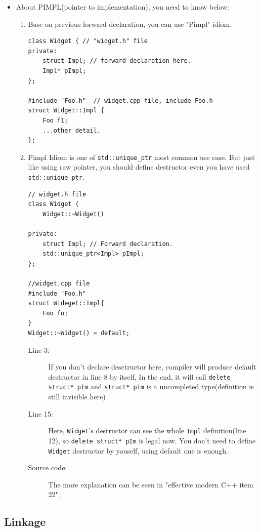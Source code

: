 \documentclass[a4paper,11pt,twoside]{book}
\begin{document}
\begin{itemize}
	\item About PIMPL(pointer to implementation), you need to know below:
	\begin{enumerate}
		\item Base on previous forward declaration, you can use "Pimpl" idiom.
\begin{lstlisting}[numbers=none]
class Widget { // "widget.h" file
private:
	struct Impl; // forward declaration here.
	Impl* pImpl;
};
		
#include "Foo.h"  // widget.cpp file, include Foo.h
struct Widget::Impl {
	Foo f1;
	...other detail.
};
\end{lstlisting}
		
		\item Pimpl Idiom is one of \texttt{std::unique\_ptr} most common use case. But just like using raw pointer,  you should define destructor even you have used \texttt{std::unique\_ptr}. 
		
\begin{lstlisting}
// widget.h file
class Widget { 
	Widget::~Widget()
	
private:
	struct Impl; // Forward declaration.
	std::unique_ptr<Impl> pImpl;
};
		
//widget.cpp file
#include "Foo.h" 
struct Wideget::Impl{
	Foo fo; 
}
Widget::~Widget() = default; 
\end{lstlisting}
\begin{description}
	\item[Line 3:] If you don't declare desctructor here, compiler will produce default destructor in line 8 by itself, In the end, it will call \texttt{delete struct* pIm} and \texttt{struct* pIm} is a uncompleted type(definition is still invisible here)
	
	\item[Line 15:] Here, \texttt{Widget}'s destructor can see the whole \texttt{Impl} definition(line 12), so \texttt{delete struct* pIm} is legal now. You don't need to define \texttt{Widget} destructor by youself, using default one is enough.
	
	\item[Source code:] The more explanation can be seen in "effective modern C++ item 22". 
\end{description}

\end{enumerate}
\end{itemize}

\subsection{Linkage}
\end{document}
